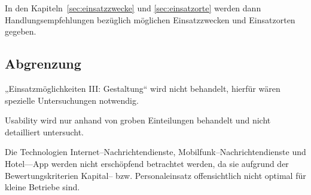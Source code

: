In den Kapiteln~\ref{sec:einsatzzwecke} und \ref{sec:einsatzorte} werden dann Handlungsempfehlungen bezüglich möglichen Einsatzzwecken und Einsatzorten gegeben.

\subsection{Abgrenzung}

„Einsatzmöglichkeiten III: Gestaltung“ wird nicht behandelt, hierfür wären spezielle Untersuchungen notwendig.

Usability wird nur anhand von groben Einteilungen behandelt und nicht detailliert untersucht.

Die Technologien Internet--Nachrichtendienste, Mobilfunk--Nachrichtendienste und Hotel––App werden nicht erschöpfend betrachtet werden, da sie aufgrund der Bewertungskriterien Kapital-- bzw. Personaleinsatz offensichtlich nicht optimal für kleine Betriebe sind.